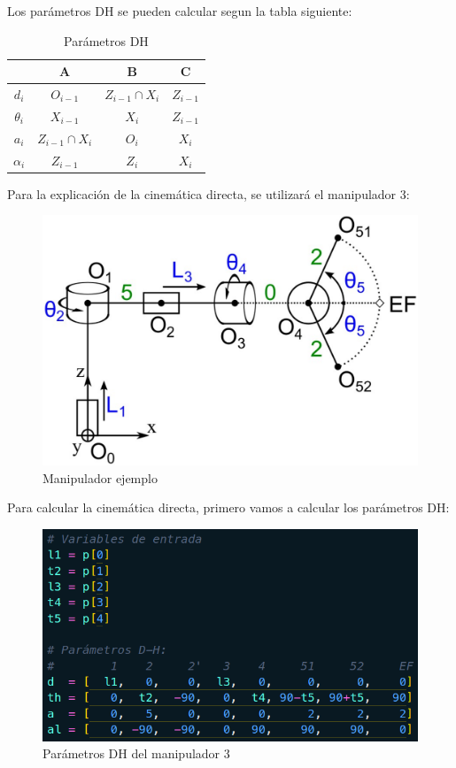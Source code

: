 \documentclass[11pt]{report}
\begin{document}
Los parámetros DH se pueden calcular segun la tabla siguiente:
\begin{table}[H]
  \centering
  \begin{tabular}{|c|c|c|c|}
    \hline
    \textbf{}           & \textbf{A}                 & \textbf{B}                 & \textbf{C}         \\ \hline
    \textbf{$d_i$}      & \texttt{$O_{i-1}$}         & \texttt{$Z_{i-1}\cap X_i$} & \texttt{$Z_{i-1}$} \\ \hline
    \textbf{$\theta_i$} & \texttt{$X_{i-1}$}         & \texttt{$X_{i}$}           & \texttt{$Z_{i-1}$} \\ \hline
    \textbf{$a_i$}      & \texttt{$Z_{i-1}\cap X_i$} & \texttt{$O_{i}$}           & \texttt{$X_{i}$}   \\ \hline
    \textbf{$\alpha_i$} & \texttt{$Z_{i-1}$}         & \texttt{$Z_{i}$}           & \texttt{$X_{i}$}   \\ \hline
  \end{tabular}
  \caption{Parámetros DH}
\end{table}

Para la explicación de la cinemática directa, se utilizará el manipulador 3:
\begin{figure}[H]
  \centering
  \includegraphics[scale=0.24]{img/manipulador.png}
  \caption{Manipulador ejemplo}
\end{figure}
Para calcular la cinemática directa, primero vamos a calcular los parámetros DH:
\begin{figure}[H]
  \centering
  \includegraphics[scale=0.4]{img/parametros_dh.png}
  \caption{Parámetros DH del manipulador 3}
\end{figure}
\end{document}
